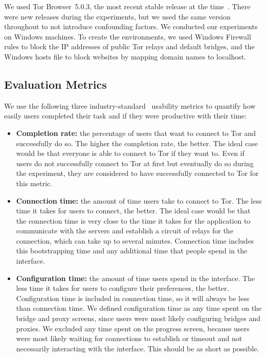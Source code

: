 \documentclass[USenglish,oneside,twocolumn]{article}
\begin{document}
We used Tor Browser~5.0.3, the most recent stable release at the time~\cite{torbrowser-503}.
There were new releases during the experiments, but we used the same version throughout to not introduce confounding factors. We conducted our experiments on Windows machines. To create the environments, we used Windows Firewall rules to block the IP addresses of public Tor relays and default bridges, and the Windows hosts file to block websites by mapping domain names to localhost. 

\subsection{Evaluation Metrics}
\label{sec:eval}
We use the following three industry-standard~\cite{albert2013measuring} usability metrics to quantify how easily users completed their task and if they were productive with their time: \\

\begin{itemize}
\item {\bfseries Completion rate:}  the percentage of users that want to connect to Tor and successfully do so. The higher the completion rate, the better. The ideal case would be that everyone is able to connect to Tor if they want to. Even if users do not successfully connect to Tor at first but eventually do so during the experiment, they are considered to have successfully connected to Tor for this metric.
\item {\bfseries Connection time:} the amount of time users take to connect to Tor. The less time it takes for users to connect, the better. The ideal case would be that the connection time is very close to the time it takes for the application to communicate with the servers and establish a circuit of relays for the connection, which can take up to several minutes. Connection time includes this bootstrapping time and any additional time that people spend in the interface.
\item {\bfseries Configuration time:} the amount of time users spend in the interface. The less time it takes for users to configure their preferences, the better. Configuration time is included in connection time, so it will always be less than connection time. We defined configuration time as any time spent on the bridge and proxy screens, since users were most likely configuring bridges and proxies. We excluded any time spent on the progress screen, because users were most likely waiting for connections to establish or timeout and not necessarily interacting with the interface. This should be as short as possible.
\end{itemize}
\end{document}
